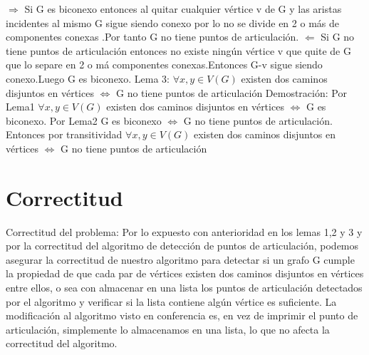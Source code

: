\documentclass{article}
\begin{document}
    $\Longrightarrow$\newline
    Si G es biconexo entonces al quitar cualquier v\'ertice v de G y las aristas incidentes al mismo 
    G sigue siendo conexo por lo no se divide en 2 o m\'as de componentes conexas .Por tanto G no
    tiene puntos de articulaci\'on.\newline
    $\Longleftarrow$\newline
    Si G no tiene puntos de articulaci\'on entonces no existe ning\'un  v\'ertice v que quite de G que lo separe en
    2 o m\'a  componentes conexas.Entonces G-v sigue siendo conexo.Luego G es biconexo.
    \newline
    \newline
    Lema 3:\newline
    $\forall x,y\in V(G)$ existen dos caminos disjuntos en v\'ertices $\Longleftrightarrow$ G no tiene puntos de articulaci\'on\newline
    Demostraci\'on:\newline
    Por Lema1  $\forall x,y\in V(G)$ existen dos caminos disjuntos en v\'ertices $\Longleftrightarrow$ G es biconexo. 
    Por Lema2 G es biconexo $\Longleftrightarrow$ G no tiene puntos de articulaci\'on.
    Entonces por transitividad $\forall x,y\in V(G)$ existen dos caminos disjuntos en v\'ertices 
    $\Longleftrightarrow$ G no tiene puntos de articulaci\'on
    \newline
    \newline
    \newline
    \section{Correctitud} 
    Correctitud del problema:
    \newline
    Por lo expuesto con anterioridad en los lemas 1,2 y 3 y por la correctitud del algoritmo de detecci\'on de puntos de 
    articulaci\'on, podemos asegurar la correctitud de nuestro algoritmo para detectar si un grafo G cumple la propiedad 
    de que cada par de v\'ertices existen dos caminos disjuntos en v\'ertices entre ellos, o sea con almacenar en una lista
    los puntos de articulaci\'on detectados por el algoritmo y verificar si la lista contiene alg\'un v\'ertice es suficiente.
    La modificaci\'on al algoritmo visto en conferencia es, en vez de imprimir el punto de articulaci\'on, simplemente lo
    almacenamos en una lista, lo que no afecta la correctitud del algoritmo. 
    \newline
\end{document}
